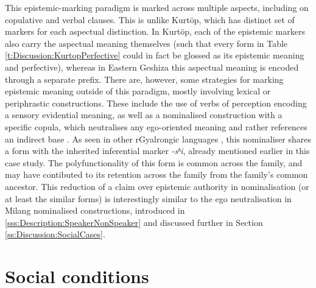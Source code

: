This epistemic-marking paradigm is marked across multiple aspects, including on copulative and verbal clauses. This is unlike Kurtöp, which has distinct set of markers for each aspectual distinction. In Kurtöp, each of the epistemic markers also carry the aspectual meaning themselves (such that every form in Table \ref{t:Discussion:KurtopPerfective} could in fact be glossed as its epistemic meaning and perfective), whereas in Eastern Geshiza this aspectual meaning is encoded through a separate prefix. There are, however, some strategies for marking epistemic meaning outside of this paradigm, mostly involving lexical or periphrastic constructions. These include the use of verbs of perception encoding a sensory evidential meaning, as well as a nominalised construction with a specific copula, which neutralises any ego-oriented meaning and rather references an indirect base \cite[596]{Honkasalo2019}. As seen in other rGyalrongic languages \cites{Lai2017}{Gates2021}{Zhang2022}, this nominaliser shares a form with the inherited inferential marker \textit{-sʰi}, already mentioned earlier in this case study. The polyfunctionality of this form is common across the family, and may have contibuted to its retention across the family from the family's common ancestor. This reduction of a claim over epistemic authority in nominalisation (or at least the similar forms) is interestingly similar to the ego neutralisation in Milang nominalised constructions, introduced in \ref{sss:Description:SpeakerNonSpeaker} and discussed further in Section \ref{ss:Discussion:SocialCases}.


\section{Social conditions}\label{s:Discussion:Social}
